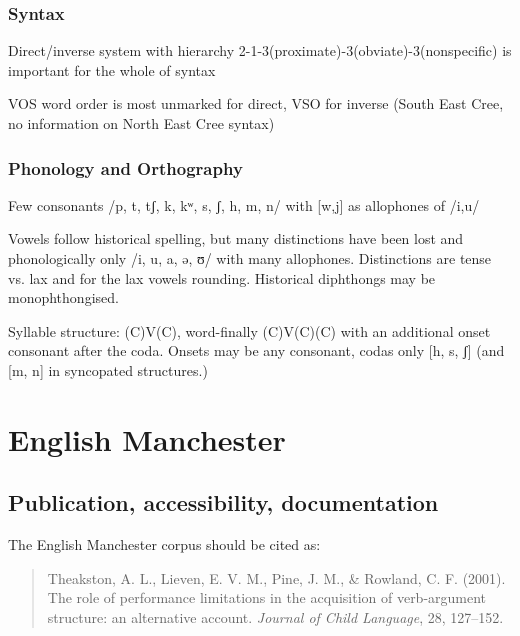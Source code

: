 \documentclass[a4paper, 11pt]{book}
\begin{document}
\subsubsection*{Syntax}

\begin{itemize*}
	\item Direct/inverse system with hierarchy 2-1-3(proximate)-3(obviate)-3(nonspecific) is important for the whole of syntax
	\item VOS word order is most unmarked for direct, VSO for inverse (South East Cree, no information on North East Cree syntax)
\end{itemize*}


\subsubsection*{Phonology and Orthography}

\begin{itemize*}
\item Few consonants /p, t, tʃ, k, kʷ, s,  ʃ, h, m, n/ with [w,j] as allophones of /i,u/
\item Vowels follow historical spelling, but many distinctions have been lost and phonologically only /i, u, a, ə, ʊ/ with many allophones. Distinctions are tense vs. lax and for the lax vowels rounding. Historical diphthongs may be monophthongised.
\item Syllable structure: (C)V(C), word-finally (C)V(C)(C) with an additional onset consonant after the coda. Onsets may be any consonant, codas only [h, s, ʃ] (and [m, n] in syncopated structures.)
\end{itemize*}

\section{English Manchester}
\label{sec:EnglishManchester}
\subsection{Publication, accessibility, documentation}
The English Manchester corpus \citep{Theakston_etal2001} should be cited as:

\begin{quote}
Theakston, A. L., Lieven, E. V. M., Pine, J. M., \& Rowland, C. F. (2001). The role of performance limitations in the acquisition of verb-argument structure: an alternative account. \textit{Journal of Child Language}, 28, 127--152.
\end{quote}
\end{document}
